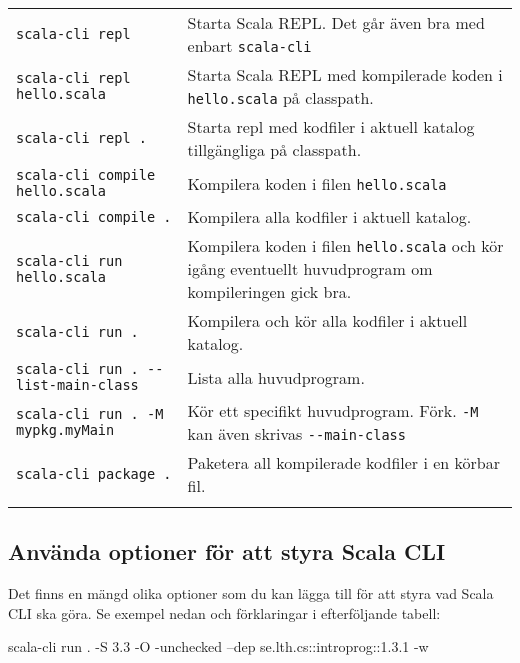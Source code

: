 \begin{table}[H]
\begin{tabular}{l p{6.5cm}}
\texttt{scala-cli repl} & Starta Scala REPL.  Det går även bra med enbart \texttt{scala-cli}\\
\texttt{scala-cli repl hello.scala} & Starta Scala REPL med kompilerade koden i \texttt{hello.scala} på classpath.  \\
\texttt{scala-cli repl .} & Starta repl med kodfiler i aktuell katalog tillgängliga på classpath. \\
\texttt{scala-cli compile hello.scala} & Kompilera koden i filen \texttt{hello.scala}  \\
\texttt{scala-cli compile .} & Kompilera alla kodfiler i aktuell katalog. \\
\texttt{scala-cli run hello.scala} & Kompilera koden i filen \texttt{hello.scala} och kör igång eventuellt huvudprogram om kompileringen gick bra. \\
\texttt{scala-cli run .} & Kompilera och kör alla kodfiler i aktuell katalog. \\
\texttt{scala-cli run . -{}-list-main-class} & Lista alla huvudprogram. \\
\texttt{scala-cli run . -M mypkg.myMain} & Kör ett specifikt huvudprogram. Förk. \texttt{-M} kan även skrivas \texttt{-{}-main-class}\\
\texttt{scala-cli package .} & Paketera all kompilerade kodfiler i en körbar fil. \\
\\
\end{tabular}
\end{table}

\subsection{Använda optioner för att styra Scala CLI}

\noindent Det finns en mängd olika optioner som du kan lägga till för att styra vad Scala CLI ska göra. Se exempel nedan och förklaringar i efterföljande tabell:
\begin{REPLsmall}
scala-cli run . -S 3.3 -O -unchecked --dep se.lth.cs::introprog::1.3.1 -w
\end{REPLsmall}


